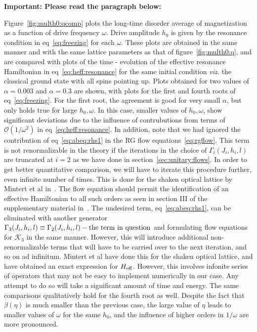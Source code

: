 \documentclass[a4paper,10pt]{article}
\begin{document}
\textbf{Important: Please read the paragraph below:}

Figure~\ref{fig:multh0:qcomp} plots the long-time disorder average of magnetization as a function of drive frequency $\omega$. Drive amplitude $h_0$ is given by the resonance condition in eq~\ref{eq:freezing} for each $\omega$. These plots are obtained in the same manner and with the same lattice parameters as that of figure~\ref{fig:multh0:q}, and are compared with plots of the time - evolution of the effective resonance Hamiltonian in eq~\ref{eq:heff:resonance} for the same initial condition \textit{viz.} the classical ground state with all spins pointing up. Plots obtained for two values of $\alpha = 0.003$ and  $\alpha = 0.3$ are shown, with plots for the first and fourth roots of eq~\ref{eq:freezing}. For the first root, the agreement is good for very small $\alpha$, but only holds true for large $h_0,\omega$. In this case, smaller values of $h_0, \omega$, show significant deviations due to the influence of contrubutions from  terms of $\mathcal{O}(1/\omega^2) $ in eq~\ref{eq:heff:resonance}. In 
addition, note that we had ignored the contribution of eq~\ref{eq:abeq:rhs1} in the RG flow equations~\ref{eq:rgflow}. This term is not renormalizable in the theory if the iterations in the choice of $\Gamma_i(J_i,h_i,l)$ are truncated at $i=2$ as we have done in section~\ref{sec:unitary:flows}. In order to get better quantitative comparison, we will have to iterate this procedure further, even infinite number of times. This is done for the shaken optical lattice by Mintert et al in~\cite{unitaryflow}. The flow equation should permit the identification of an effective Hamiltonian to all such orders as seen in section III of the supplementary material in~\cite{unitaryflow}. The undesired term, eq~\ref{eq:abeq:rhs1}, can be eliminated with another generator $\Gamma_3(J_i,h_i,l)\equiv \Gamma_2(J_i,h_i,l) - {\rm the\ term\ in\ question}$ and formulating flow equations for $\mathcal{K}_3$ in the same manner. However, this will introduce additional non-renormalizable terms that will have to be carried over to the 
next 
iteration, and so on ad infinitum. Mintert et al have done this for the shaken optical lattice, and have obtained an exact expression for $H_{\rm eff}$. However, this involves infonite series of operators that may not be easy to implement numerically in our case. Any attempt to do so will take a significant amount of time and energy. The same comparisons qualitatively hold for the fourth root as well. Despite the fact that $\beta(\eta)$ is much smaller than the previous case, the large value of $\eta$ leads to smaller values of $\omega$ for the same $h_0$, and the influence of higher orders in $1/\omega$ are more pronounced.
\end{document}

